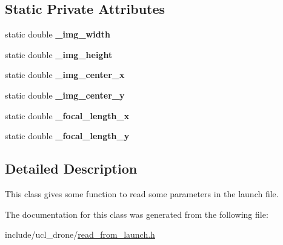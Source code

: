 \subsection*{Static Private Attributes}
\begin{DoxyCompactItemize}
\item 
\mbox{\label{classRead_a164760785ae316dc6972da66fb3668f8}} 
static double {\bfseries \+\_\+img\+\_\+width}
\item 
\mbox{\label{classRead_a581004694cd0053e64a6336483cd6532}} 
static double {\bfseries \+\_\+img\+\_\+height}
\item 
\mbox{\label{classRead_a82d764794aa9b4339319c4762f6daf4a}} 
static double {\bfseries \+\_\+img\+\_\+center\+\_\+x}
\item 
\mbox{\label{classRead_a5507437f691645f2a7d9cd7f7c9b8ca0}} 
static double {\bfseries \+\_\+img\+\_\+center\+\_\+y}
\item 
\mbox{\label{classRead_ad24831b5bf16adc8136acb7e0ea6b5be}} 
static double {\bfseries \+\_\+focal\+\_\+length\+\_\+x}
\item 
\mbox{\label{classRead_a15b8a0e4c01a9aa97a47c261714ac44e}} 
static double {\bfseries \+\_\+focal\+\_\+length\+\_\+y}
\end{DoxyCompactItemize}


\subsection{Detailed Description}
This class gives some function to read some parameters in the launch file. 

The documentation for this class was generated from the following file\+:\begin{DoxyCompactItemize}
\item 
include/ucl\+\_\+drone/\hyperlink{read__from__launch_8h}{read\+\_\+from\+\_\+launch.\+h}\end{DoxyCompactItemize}
